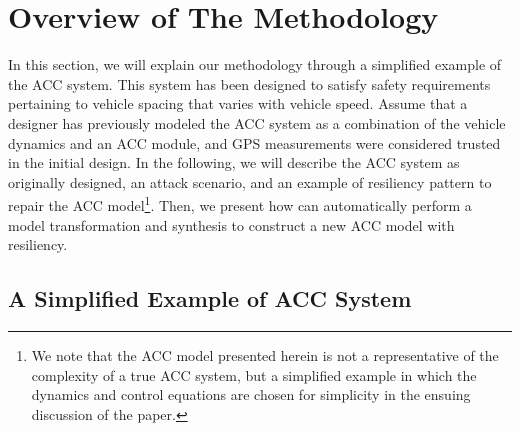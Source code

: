 \section{Overview of The Methodology}
%
%
%
In this section, we will explain our methodology through a simplified example of the ACC system. This system has been designed to satisfy safety requirements pertaining to vehicle spacing that varies with vehicle speed.
%
%
%
Assume that a designer has previously modeled the ACC system as a combination of the vehicle dynamics and an ACC module, and GPS measurements were considered trusted in the initial design. In the following, we will describe the ACC system as originally designed, an attack scenario, and an example of resiliency pattern to repair the ACC model\footnote{We note that the ACC model presented herein is not a representative of the complexity of a true ACC system, but a simplified example in which the dynamics and control equations are chosen for simplicity in the ensuing discussion of the paper.}.
%
Then, we present how \toolreaffirm can automatically perform a model transformation and synthesis to construct a new ACC model with resiliency. 
%
%

\subsection{A Simplified Example of ACC System}




